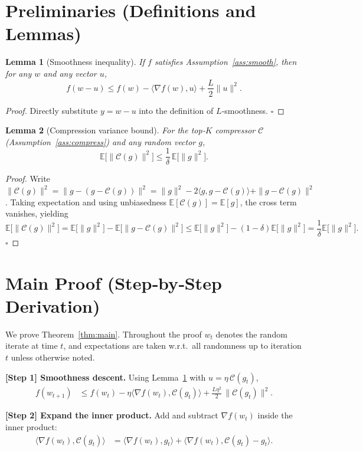 \documentclass{article}
\newtheorem{lemma}{Lemma}
\newcommand{\E}{\mathbb{E}}
\newcommand{\C}{\mathcal{C}}
\begin{document}
\newpage

\section*{Preliminaries (Definitions and Lemmas)}
\begin{lemma}[Smoothness inequality]\label{lem:smooth}
If $f$ satisfies Assumption~\ref{ass:smooth}, then for any $w$ and any vector $u$,
\[
f(w-u)\le f(w)-\langle\nabla f(w),u\rangle+\frac{L}{2}\|u\|^{2}.
\]
\end{lemma}
\begin{proof}
Directly substitute $y=w-u$ into the definition of $L$‑smoothness. \hfill$\square$
\end{proof}

\begin{lemma}[Compression variance bound]\label{lem:compress}
For the top‑$K$ compressor $\C$ (Assumption~\ref{ass:compress}) and any random vector $g$,
\[
\E\!\bigl[\|\C(g)\|^{2}\bigr]\le\frac{1}{\delta}\,\E\!\bigl[\|g\|^{2}\bigr].
\]
\end{lemma}
\begin{proof}
Write $\|\C(g)\|^{2}= \|g-(g-\C(g))\|^{2}= \|g\|^{2}-2\langle g,g-\C(g)\rangle+\|g-\C(g)\|^{2}$.  
Taking expectation and using unbiasedness $\E[\C(g)]=\E[g]$, the cross term vanishes, yielding
\[
\E\!\bigl[\|\C(g)\|^{2}\bigr]=\E\!\bigl[\|g\|^{2}\bigr]-\E\!\bigl[\|g-\C(g)\|^{2}\bigr]
\le \E\!\bigl[\|g\|^{2}\bigr]-(1-\delta)\E\!\bigl[\|g\|^{2}\bigr]
=\frac{1}{\delta}\E\!\bigl[\|g\|^{2}\bigr].
\] \hfill$\square$
\end{proof}

\section*{Main Proof (Step‑by‑Step Derivation)}
We prove Theorem~\ref{thm:main}.  Throughout the proof $w_t$ denotes the random iterate at time $t$, and expectations are taken w.r.t.\ all randomness up to iteration $t$ unless otherwise noted.

\bigskip
\noindent\textbf{[Step 1] Smoothness descent.}  
Using Lemma~\ref{lem:smooth} with $u=\eta\,\C(g_t)$,
\begin{align}
f(w_{t+1})
&\le f(w_t)-\eta\langle\nabla f(w_t),\C(g_t)\rangle
+\frac{L\eta^{2}}{2}\,\|\C(g_t)\|^{2}. \label{eq:smooth-descent}
\end{align}

\noindent\textbf{[Step 2] Expand the inner product.}  
Add and subtract $\nabla f(w_t)$ inside the inner product:
\begin{align}
\langle\nabla f(w_t),\C(g_t)\rangle
&=\langle\nabla f(w_t),g_t\rangle
+\langle\nabla f(w_t),\C(g_t)-g_t\rangle. \label{eq:inner-expand}
\end{align}
\end{document}
